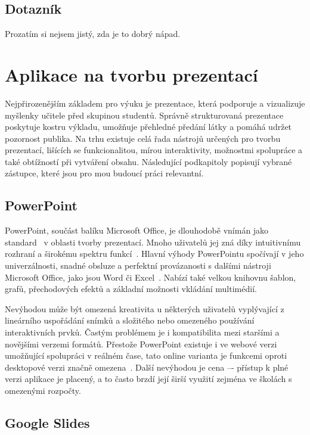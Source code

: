 \subsection{Dotazník}

Prozatím si nejsem jistý, zda je to dobrý nápad.

\section{Aplikace na tvorbu prezentací}

Nejpřirozenějším základem pro výuku je prezentace, která podporuje a vizualizuje myšlenky učitele před skupinou studentů.
Správně strukturovaná prezentace poskytuje kostru výkladu, umožňuje přehledné předání látky a pomáhá udržet pozornost publika.
Na trhu existuje celá řada nástrojů určených pro tvorbu prezentací, lišících se funkcionalitou, mírou interaktivity, možnostmi spolupráce a také obtížností při vytváření obsahu.
Následující podkapitoly popisují vybrané zástupce, které jsou pro mou budoucí práci relevantní.

\subsection{PowerPoint}

PowerPoint, součást balíku Microsoft Office, je dlouhodobě vnímán jako standard~\cite{pp_usage} v oblasti tvorby prezentací.
Mnoho uživatelů jej zná díky intuitivnímu rozhraní a širokému spektru funkcí~\cite{pp_usage}.
Hlavní výhody PowerPointu spočívají v jeho univerzálnosti, snadné obsluze a perfektní provázanosti s dalšími nástroji Microsoft Office, jako jsou Word či Excel~\cite{pp_excel, pp_word}.
Nabízí také velkou knihovnu šablon, grafů, přechodových efektů a základní možnosti vkládání multimédií.

Nevýhodou může být omezená kreativita u některých uživatelů vyplývající z lineárního uspořádání snímků a složitého nebo omezeného používání interaktivních prvků. 
Častým problémem je i kompatibilita mezi staršími a novějšími verzemi formátů.
Přestože PowerPoint existuje i ve webové verzi umožňující spolupráci v reálném čase, tato online varianta je funkcemi oproti desktopové verzi značně omezena~\cite{pp_platforms}.
Další nevýhodou je cena –- přístup k plné verzi aplikace je placený, a to často brzdí její širší využití zejména ve školách s omezenými rozpočty.

\subsection{Google Slides}\label{text:google_slides}

